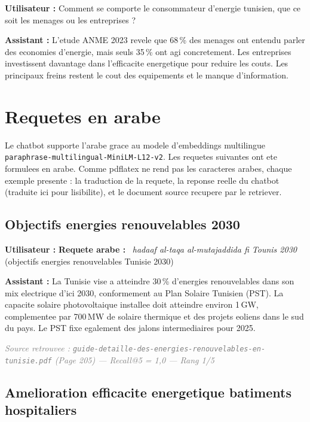 \documentclass[12pt,a4paper,oneside]{article}
\newcommand{\prompt}[1]{%
  \noindent\colorbox{PromptBg}{\parbox{\dimexpr\linewidth-2\fboxsep}{%
    \small\textbf{\textcolor{MainBlue}{Utilisateur :}} #1%
  }}\vspace{3pt}%
}
\newcommand{\botreply}[1]{%
  \noindent\colorbox{OutputBg}{\parbox{\dimexpr\linewidth-2\fboxsep}{%
    \small\textbf{\textcolor{PassGreen!70!black}{Assistant :}} #1%
  }}\vspace{6pt}%
}
\begin{document}
\prompt{Comment se comporte le consommateur d'energie tunisien, que ce soit les menages ou les entreprises ?}

\botreply{
L'etude ANME 2023 revele que 68\,\% des menages ont entendu parler des economies d'energie, mais seuls 35\,\% ont agi concretement. Les entreprises investissent davantage dans l'efficacite energetique pour reduire les couts. Les principaux freins restent le cout des equipements et le manque d'information.
}

\clearpage

\section{Requetes en arabe}

Le chatbot supporte l'arabe grace au modele d'embeddings multilingue \texttt{paraphrase-multilingual-MiniLM-L12-v2}. Les requetes suivantes ont ete formulees en arabe. Comme pdflatex ne rend pas les caracteres arabes, chaque exemple presente : la traduction de la requete, la reponse reelle du chatbot (traduite ici pour lisibilite), et le document source recupere par le retriever.

\subsection{Objectifs energies renouvelables 2030}

\prompt{\textbf{Requete arabe :} ~\textit{hadaaf al-taqa al-mutajaddida fi Tounis 2030} (objectifs energies renouvelables Tunisie 2030)}

\botreply{
La Tunisie vise a atteindre 30\,\% d'energies renouvelables dans son mix electrique d'ici 2030, conformement au Plan Solaire Tunisien (PST). La capacite solaire photovoltaique installee doit atteindre environ 1\,GW, complementee par 700\,MW de solaire thermique et des projets eoliens dans le sud du pays. Le PST fixe egalement des jalons intermediaires pour 2025.
}

\noindent\small\textit{\textcolor{gray}{Source retrouvee : \texttt{guide-detaille-des-energies-renouvelables-en-tunisie.pdf} (Page 205) --- Recall@5 = 1,0 --- Rang 1/5}}

\bigskip

\subsection{Amelioration efficacite energetique batiments hospitaliers}
\end{document}
